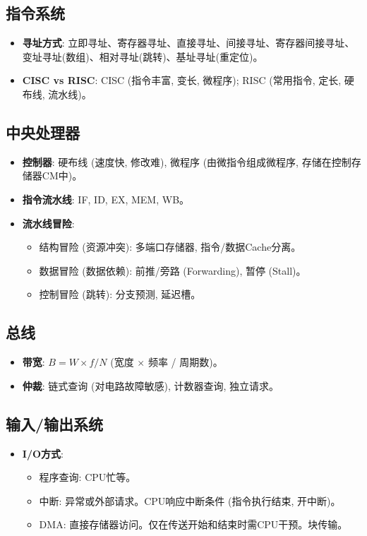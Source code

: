 \documentclass[cn,hazy,blue,12pt,screen,normal]{elegantnote}
\begin{document}
\subsection{指令系统}
\begin{itemize}
    \item \textbf{寻址方式}: 立即寻址、寄存器寻址、直接寻址、间接寻址、寄存器间接寻址、变址寻址(数组)、相对寻址(跳转)、基址寻址(重定位)。
    \item \textbf{CISC vs RISC}: CISC (指令丰富, 变长, 微程序); RISC (常用指令, 定长, 硬布线, 流水线)。
\end{itemize}

\subsection{中央处理器}
\begin{itemize}
    \item \textbf{控制器}: 硬布线 (速度快, 修改难), 微程序 (由微指令组成微程序, 存储在控制存储器CM中)。
    \item \textbf{指令流水线}: IF, ID, EX, MEM, WB。
    \item \textbf{流水线冒险}:
    \begin{itemize}
        \item 结构冒险 (资源冲突): 多端口存储器, 指令/数据Cache分离。
        \item 数据冒险 (数据依赖): 前推/旁路 (Forwarding), 暂停 (Stall)。
        \item 控制冒险 (跳转): 分支预测, 延迟槽。
    \end{itemize}
\end{itemize}

\subsection{总线}
\begin{itemize}
    \item \textbf{带宽}: $B = W \times f / N$ (宽度 $\times$ 频率 / 周期数)。
    \item \textbf{仲裁}: 链式查询 (对电路故障敏感), 计数器查询, 独立请求。
\end{itemize}

\subsection{输入/输出系统}
\begin{itemize}
    \item \textbf{I/O方式}:
    \begin{itemize}
        \item 程序查询: CPU忙等。
        \item 中断: 异常或外部请求。CPU响应中断条件 (指令执行结束, 开中断)。
        \item DMA: 直接存储器访问。仅在传送开始和结束时需CPU干预。块传输。
    \end{itemize}
\end{itemize}
\end{document}
